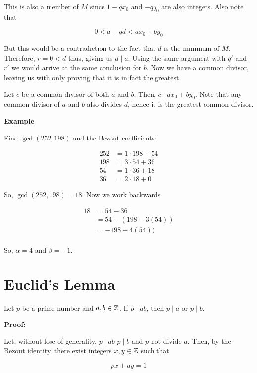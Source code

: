 This is also a member of \(M\) since \(1 - qx_0\) and \(-qy_0\) are also integers. Also note that

\[
	0 < a - qd < ax_0 + by_0
\]

But this would be a contradiction to the fact that \(d\) is the minimum of \(M\). Therefore, \(r = 0 < d\) thus,
giving us \(d \mid a\). Using the same argument with \(q'\) and \(r'\) we would arrive at the same conclusion for \(b\).
Now we have a common divisor, leaving us with only proving that it is in fact the greatest.

Let \(c\) be a common divisor of both \(a\) and \(b\). Then, \(c \mid ax_0 + by_0\). Note that any common divisor of \(a\) and \(b\)
also divides \(d\), hence it is the greatest common divisor.

\QED

\textbf{Example}

Find \(\gcd(252, 198)\) and the Bezout coefficients:

\begin{align*}
	252 & = 1 \cdot 198 + 54 \\
	198 & = 3 \cdot 54 + 36  \\
	54  & = 1 \cdot 36 + 18  \\
	36  & = 2 \cdot 18 + 0
\end{align*}

So, \(\gcd(252, 198) = 18\). Now we work backwards


\begin{align*}
	18 & = 54 - 36            \\
	   & = 54 - (198 - 3(54)) \\
	   & = -198 + 4(54))      \\
\end{align*}

So, \(\alpha = 4\) and \(\beta = -1\).

\section{Euclid's Lemma}

Let \(p\) be a prime number and \(a, b \in \mathbb{Z}\). If \(p \mid ab\), then \(p \mid a\) or \(p \mid b\).

\textbf{Proof:}

Let, without lose of generality, \(p \mid ab\) \(p \mid b\) and \(p\) not divide \(a\).
Then, by the Bezout identity, there exist integers \(x, y \in \mathbb{Z}\) such that

\[
	px + ay = 1
\]


